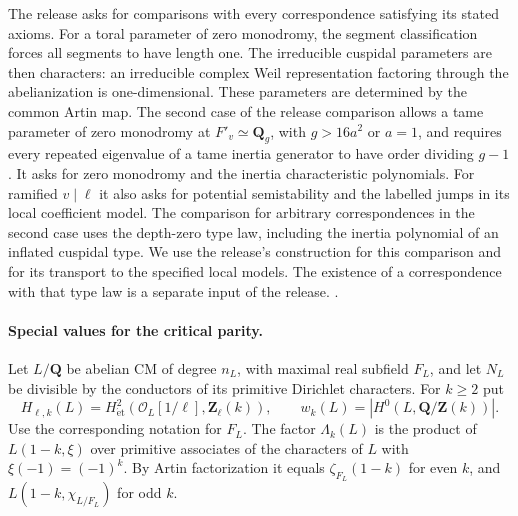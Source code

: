 The release asks for comparisons with every correspondence satisfying
its stated axioms. For a toral parameter of zero monodromy, the
segment classification forces all segments to have length one.
The irreducible cuspidal parameters are then characters: an irreducible
complex Weil representation factoring through the abelianization is
one-dimensional. These parameters are determined by the common
Artin map. The second case of the release comparison allows a tame
parameter of zero monodromy at \(F'_v\simeq\mathbf Q_g\), with
\(g>16a^2\) or \(a=1\), and requires every repeated eigenvalue of a
tame inertia generator to have order dividing \(g-1\).
It asks for zero monodromy and the inertia characteristic polynomials.
For ramified \(v\mid\ell\) it also asks for potential semistability and
the labelled jumps in its local coefficient model. The comparison
for arbitrary correspondences in the second case uses the
depth-zero type law, including the inertia polynomial of an inflated
cuspidal type. We use the release's construction for this comparison
and for its transport to the specified local models. The existence of
a correspondence with that type law is a separate input of the release.
.

\paragraph{Special values for the critical parity.}
%
Let \(L/\mathbf Q\) be abelian CM of degree \(n_L\), with maximal
real subfield \(F_L\), and let \(N_L\) be divisible by the conductors
of its primitive Dirichlet characters. For \(k\ge2\) put
\[
 H_{\ell,k}(L)=H^2_{\mathrm{\acute et}}
          (\mathcal O_L[1/\ell],\mathbf Z_\ell(k)),
 \qquad w_k(L)=|H^0(L,\mathbf Q/\mathbf Z(k))|.
\]
Use the corresponding notation for \(F_L\). The factor
\(\Lambda_k(L)\) is the product of \(L(1-k,\xi)\) over primitive
associates of the characters of \(L\) with
\(\xi(-1)=(-1)^k\). By Artin factorization it equals
\(\zeta_{F_L}(1-k)\) for even \(k\), and
\(L(1-k,\chi_{L/F_L})\) for odd \(k\).

